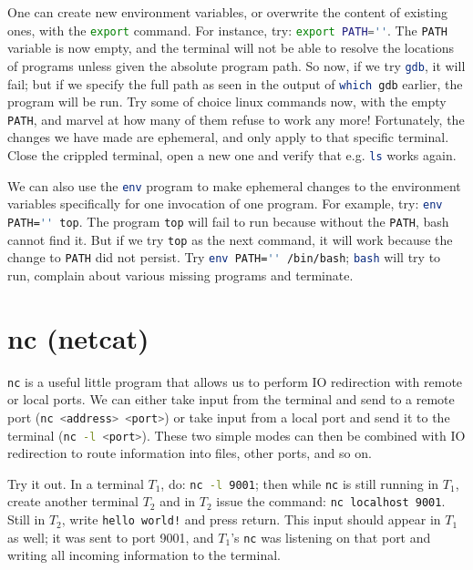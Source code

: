 \documentclass{article}
\newcommand{\xcode}[2]{\colorbox{ubuntuback}{\lstinline[language=#1]|#2|}}
\newcommand{\code}[1]{\colorbox{ubuntuback}{\texttt{#1}}}
\begin{document}
One can create new environment variables, or overwrite the content of existing ones, with the \xcode{bash}{export} command. For instance, try: \xcode{bash}{export PATH=''}. The \code{PATH} variable is now empty, and the terminal will not be able to resolve the locations of programs unless given the absolute program path. So now, if we try \xcode{bash}{gdb}, it will fail; but if we specify the full path as seen in the output of \xcode{bash}{which gdb} earlier, the program will be run. Try some of choice linux commands now, with the empty \code{PATH}, and marvel at how many of them refuse to work any more! Fortunately, the changes we have made are ephemeral, and only apply to that specific terminal. Close the crippled terminal, open a new one and verify that e.g. \xcode{bash}{ls} works again.

We can also use the \xcode{bash}{env} program to make ephemeral changes to the environment variables specifically for one invocation of one program. For example, try: \xcode{bash}{env PATH='' top}. The program \xcode{bash}{top} will fail to run because without the \code{PATH}, bash cannot find it. But if we try \xcode{bash}{top} as the next command, it will work because the change to \code{PATH} did not persist. Try \xcode{bash}{env PATH='' /bin/bash}; \xcode{bash}{bash} will try to run, complain about various missing programs and terminate.

\section{nc (netcat)}

\xcode{bash}{nc} is a useful little program that allows us to perform IO redirection with remote or local ports. We can either take input from the terminal and send to a remote port (\xcode{bash}{nc <address> <port>}) or take input from a local port and send it to the terminal (\xcode{bash}{nc -l <port>}). These two simple modes can then be combined with IO redirection to route information into files, other ports, and so on.

Try it out. In a terminal $T_1$, do: \xcode{bash}{nc -l 9001}; then while \xcode{bash}{nc} is still running in $T_1$, create another terminal $T_2$ and in $T_2$ issue the command: \xcode{bash}{nc localhost 9001}. Still in $T_2$, write \xcode{bash}{hello world!} and press return. This input should appear in $T_1$ as well; it was sent to port 9001, and $T_1$'s \xcode{bash}{nc} was listening on that port and writing all incoming information to the terminal. 
\end{document}
